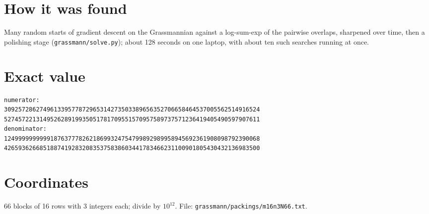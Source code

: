\documentclass[11pt,a4paper]{article}
\begin{document}
\section{How it was found}
Many random starts of gradient descent on the Grassmannian against a log-sum-exp of the pairwise overlaps, sharpened over time, then a polishing stage (\texttt{grassmann/solve.py}); about 128 seconds on one laptop, with about ten such searches running at once.


\appendix
\section{Exact value}
{\small
\begin{verbatim}
numerator:
309257286274961339577872965314273503389656352706658464537005562514916524
527457221314952628919935051781709551570957589737571236419405490597907611
denominator:
124999999999918763777826218699324754799892989958945692361908098792390068
426593626685188741928320835375838603441783466231100901805430432136983500
\end{verbatim}}

\section{Coordinates}
66 blocks of 16 rows with 3 integers each; divide by $10^{12}$. File: \texttt{grassmann/packings/m16n3N66.txt}.
{\tiny
\begin{multicols}{3}
\end{multicols}}
\end{document}
